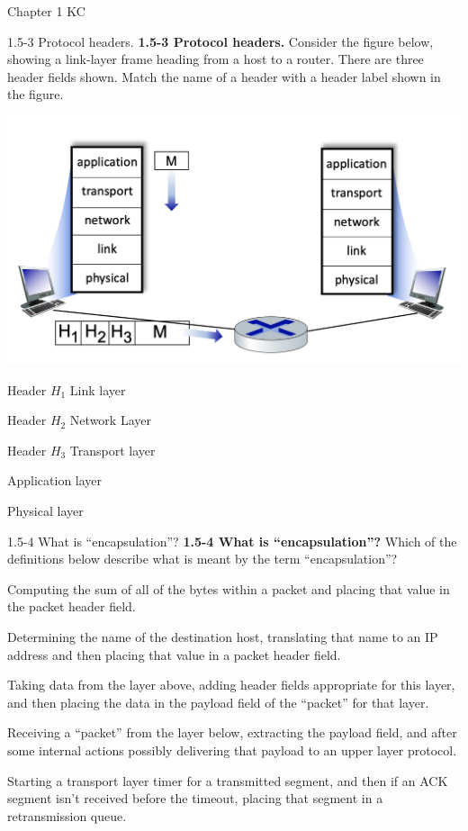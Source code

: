 \documentclass[a4paper]{article}
\begin{document}
\begin{quiz}{Chapter 1 KC}
\begin{matching}[points=1,shuffle=true]{1.5-3 Protocol headers.}
\textbf{1.5-3 Protocol headers.}
Consider the figure below, showing a link-layer frame heading from a host to a router. There are three header fields shown. Match the name of a header with a header label shown in the figure. 
\begin{center}
\includegraphics[width=.9\linewidth]{figs/1.5.3.jpg}
\end{center}
\item Header $H_1$ \answer Link layer
\item Header $H_2$ \answer Network Layer
\item Header $H_3$ \answer Transport layer
\item \answer Application layer
\item \answer Physical layer
\end{matching}

\begin{multi}[points=1,shuffle=true]{1.5-4 What is ``encapsulation''?}
\textbf{1.5-4 What is ``encapsulation''?} 
Which of the definitions below describe what is meant by the term ``encapsulation''?
\item Computing the sum of all of the bytes within a packet and placing that value in the packet header field.
\item Determining the name of the destination host, translating that name to an IP address and then placing that value in a packet header field.
\item* Taking data from the layer above, adding header fields appropriate for this layer, and then placing the data in the payload field of the ``packet'' for that layer.
\item Receiving a ``packet'' from the layer below, extracting the payload field, and after some internal actions possibly delivering that payload to an upper layer protocol.
\item Starting a transport layer timer for a transmitted segment, and then if an ACK segment isn't received before the timeout, placing that segment in a retransmission queue.
\end{multi}


\end{quiz}
\end{document}
